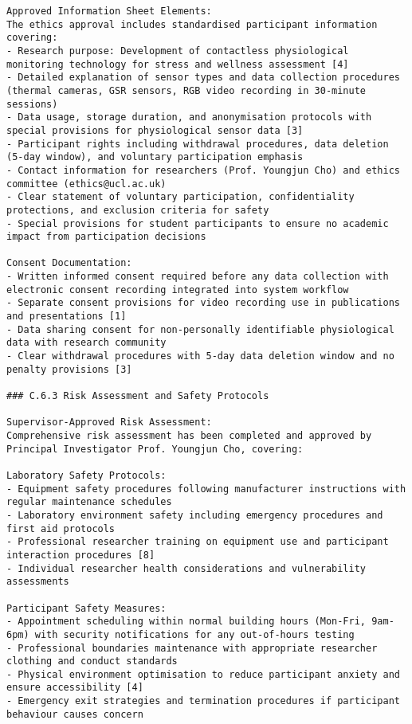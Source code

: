 \begin{verbatim}
Approved Information Sheet Elements:
The ethics approval includes standardised participant information covering:
- Research purpose: Development of contactless physiological monitoring technology for stress and wellness assessment [4]
- Detailed explanation of sensor types and data collection procedures (thermal cameras, GSR sensors, RGB video recording in 30-minute sessions)
- Data usage, storage duration, and anonymisation protocols with special provisions for physiological sensor data [3]
- Participant rights including withdrawal procedures, data deletion (5-day window), and voluntary participation emphasis
- Contact information for researchers (Prof. Youngjun Cho) and ethics committee (ethics@ucl.ac.uk)
- Clear statement of voluntary participation, confidentiality protections, and exclusion criteria for safety
- Special provisions for student participants to ensure no academic impact from participation decisions

Consent Documentation:
- Written informed consent required before any data collection with electronic consent recording integrated into system workflow
- Separate consent provisions for video recording use in publications and presentations [1]
- Data sharing consent for non-personally identifiable physiological data with research community
- Clear withdrawal procedures with 5-day data deletion window and no penalty provisions [3]

### C.6.3 Risk Assessment and Safety Protocols

Supervisor-Approved Risk Assessment:
Comprehensive risk assessment has been completed and approved by Principal Investigator Prof. Youngjun Cho, covering:

Laboratory Safety Protocols:
- Equipment safety procedures following manufacturer instructions with regular maintenance schedules
- Laboratory environment safety including emergency procedures and first aid protocols
- Professional researcher training on equipment use and participant interaction procedures [8]
- Individual researcher health considerations and vulnerability assessments

Participant Safety Measures:
- Appointment scheduling within normal building hours (Mon-Fri, 9am-6pm) with security notifications for any out-of-hours testing
- Professional boundaries maintenance with appropriate researcher clothing and conduct standards
- Physical environment optimisation to reduce participant anxiety and ensure accessibility [4]
- Emergency exit strategies and termination procedures if participant behaviour causes concern


\end{verbatim}
